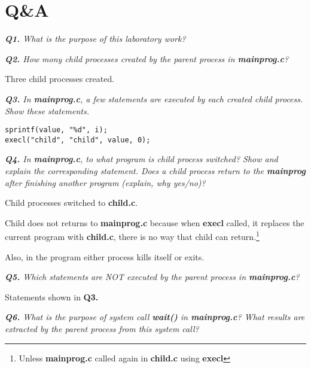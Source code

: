 \documentclass[11pt]{article}
\begin{document}
\section*{Q\&A}

\textit{\textbf{Q1.} What is the purpose of this laboratory work?}
\vspace{3mm}


\vspace{3mm}
\textit{\textbf{Q2.} How mony child processes created by the parent process in \textbf{mainprog.c}?}
\vspace{3mm}

Three child processes created.

\vspace{3mm}
\textit{\textbf{Q3.} In \textbf{mainprog.c}, a few statements are executed by each created child process. Show these statements.}
\vspace{3mm}

\begin{lstlisting}[frame=tlrb]
sprintf(value, "%d", i);
execl("child", "child", value, 0);
\end{lstlisting}

\vspace{5mm}
\textit{\textbf{Q4.} In \textbf{mainprog.c}, to what program is child process switched? Show and explain the corresponding statement. Does a child process return to the \textbf{mainprog} after finishing another program (explain, why yes/no)?}
\vspace{5mm}

Child processes switched to \textbf{child.c}.

Child does not returns to \textbf{mainprog.c} because when \textbf{execl} called, it replaces the current program with \textbf{child.c}, there is no way that child can return.\footnote{Unless \textbf{mainprog.c} called again in \textbf{child.c} using \textbf{execl}}

Also, in the program either process kills itself or exits.

\vspace{5mm}
\textit{\textbf{Q5.} Which statements are NOT executed by the parent process in \textbf{mainprog.c}?}
\vspace{5mm}

Statements shown in \textbf{Q3.}

\vspace{5mm}
\textit{\textbf{Q6.} What is the purpose of system call \textbf{wait()} in \textbf{mainprog.c}? What results are extracted by the parent process from this system call?}
\vspace{5mm}
\end{document}
